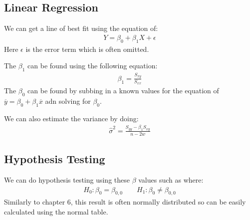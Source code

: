 \documentclass[12pt,letterpaper]{article} \usepackage{amsmath} \usepackage{graphicx} \usepackage[margin=1in]{geometry} \usepackage{longtable}  \usepackage{amssymb}
\begin{document}
	\subsection{Linear Regression}
	We can get a line of best fit using the equation of:
	\begin{align*}
		Y = \beta_0 + \beta_1 X+ \epsilon
	\end{align*}
	Here $\epsilon$ is the error term which is often omitted. 
	
	The $\beta_1$ can be found using the following equation:
	\begin{align*}
		\beta_1 = \frac{S_{xy}}{S_{xx}}
	\end{align*}
	The $\beta_0$ can be found by subbing in a known values for the equation of $\overline y = \beta_0 + \beta_1 \overline x$ adn solving for $\beta_0$.
	
	We can also estimate the variance by doing:
	\begin{align*}
		\hat \sigma^2 = \frac{S_{yy} - \beta_1 S_{xy}}{n-2w}
	\end{align*}
	
	\subsection{Hypothesis Testing}
	We can do hypothesis testing using these $\beta$ values such as where:
	\begin{align*}
		H_0: \beta_0 = \beta_{0,0} \qquad H_1: \beta_0 \ne \beta_{0,0}
	\end{align*}
	Similarly to chapter 6, this result is often normally distributed so can be easily calculated using the normal table. 
	
\end{document}
